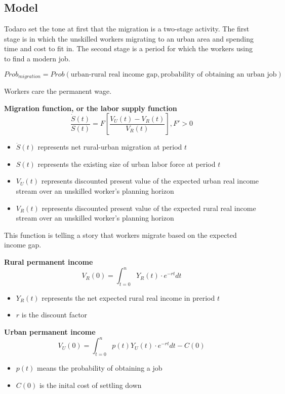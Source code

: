 \documentclass{article}
\numberwithin{equation}{section} %
\begin{document}
\subsection{Model} %
\label{sub:model}

Todaro set the tone at first that the migration is a two-stage activity. The first stage is in which the unskilled workers migrating to an urban area and spending time and cost to fit in. The second stage is a period for which the workers using to find a modern job.

\begin{equation}
  Prob_{migration}=Prob(\text{urban-rural real income gap},\text{probability of obtaining an urban job})
\end{equation}

Workers care the permanent wage.

\textbf{Migration function, or the labor supply function}
\begin{equation}
  \frac{\dot S(t)}{S(t)}=F[\frac{V_U(t)-V_R(t)}{V_R(t)}],F'>0
  \label{Todaro labor supply function}
\end{equation}

\begin{itemize}
  \item $\dot S(t)$ represents net rural-urban migration at period $t$
  \item $S(t)$ represents the existing size of urban labor force at period $t$
  \item $V_U(t)$ represents discounted present value of the expected urban real income stream over an unskilled worker's planning horizon
  \item $V_R(t)$ represents discounted present value of the expected rural real income stream over an unskilled worker's planning horizon
\end{itemize}

This function is telling a story that workers migrate based on the expected income gap.

\textbf{Rural permanent income}
\begin{equation}
  V_R(0)=\int_{t=0}^n Y_R(t)\cdot e^{-rt}dt
\end{equation}
\begin{itemize}
  \item $Y_R(t)$ represents the net expected rural real income in preriod $t$
  \item $r$ is the discount factor
\end{itemize}

\textbf{Urban permanent income}
\begin{equation}
  V_U(0)=\int_{t=0}^n p(t)Y_U(t)\cdot e^{-rt}dt-C(0)
\end{equation}
\begin{itemize}
  \item $p(t)$ means the probability of obtaining a job
  \item $C(0)$ is the inital cost of settling down
\end{itemize}
\end{document}
